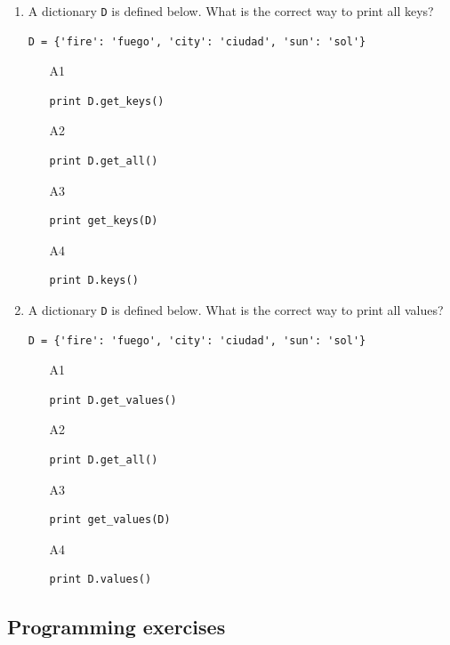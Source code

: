 \begin{enumerate}
\begin{enumerate}
\end{enumerate}
\item A dictionary {\tt D} is defined below. What is the correct way to print 
all keys?
\begin{verbatim}
D = {'fire': 'fuego', 'city': 'ciudad', 'sun': 'sol'}
\end{verbatim}
\begin{enumerate}
\item[A1] 
\begin{verbatim}
print D.get_keys()
\end{verbatim}
\item[A2] 
\begin{verbatim}
print D.get_all()
\end{verbatim}
\item[A3] 
\begin{verbatim}
print get_keys(D)
\end{verbatim}
\item[A4] 
\begin{verbatim}
print D.keys()
\end{verbatim}
\end{enumerate}
\item A dictionary {\tt D} is defined below. What is the correct way to print 
all values?
\begin{verbatim}
D = {'fire': 'fuego', 'city': 'ciudad', 'sun': 'sol'}
\end{verbatim}
\begin{enumerate}
\item[A1] 
\begin{verbatim}
print D.get_values()
\end{verbatim}
\item[A2] 
\begin{verbatim}
print D.get_all()
\end{verbatim}
\item[A3] 
\begin{verbatim}
print get_values(D)
\end{verbatim}
\item[A4] 
\begin{verbatim}
print D.values()
\end{verbatim}
\end{enumerate}
\end{enumerate}

\subsection{Programming exercises}

